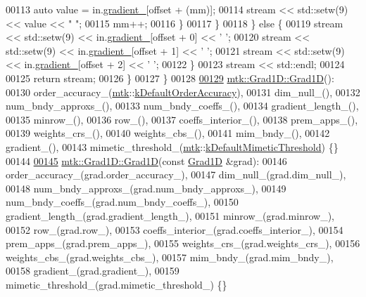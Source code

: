 \begin{DoxyCode}
00113         \textcolor{keyword}{auto} value = in.\hyperlink{classmtk_1_1Grad1D_a024b84b1ea285c0c590eb42d40ff4469}{gradient\_}[offset + (mm)];
00114         stream << std::setw(9) << value << \textcolor{stringliteral}{" "};
00115         mm++;
00116       \}
00117     \}
00118   \} \textcolor{keywordflow}{else} \{
00119     stream << std::setw(9) << in.\hyperlink{classmtk_1_1Grad1D_a024b84b1ea285c0c590eb42d40ff4469}{gradient\_}[offset + 0] << \textcolor{charliteral}{' '};
00120     stream << std::setw(9) << in.\hyperlink{classmtk_1_1Grad1D_a024b84b1ea285c0c590eb42d40ff4469}{gradient\_}[offset + 1] << \textcolor{charliteral}{' '};
00121     stream << std::setw(9) << in.\hyperlink{classmtk_1_1Grad1D_a024b84b1ea285c0c590eb42d40ff4469}{gradient\_}[offset + 2] << \textcolor{charliteral}{' '};
00122   \}
00123   stream << std::endl;
00124 
00125   \textcolor{keywordflow}{return} stream;
00126 \}
00127 \}
00128 
\hypertarget{mtk__grad__1d_8cc_source_l00129}{}\hyperlink{classmtk_1_1Grad1D_ae21e6ac2652e653c48f15b304ee83a75}{00129} \hyperlink{classmtk_1_1Grad1D_ae21e6ac2652e653c48f15b304ee83a75}{mtk::Grad1D::Grad1D}():
00130   order\_accuracy\_(\hyperlink{namespacemtk}{mtk}::\hyperlink{group__c01-roots_ga0d95560098eb36420511103637b6952f}{kDefaultOrderAccuracy}),
00131   dim\_null\_(),
00132   num\_bndy\_approxs\_(),
00133   num\_bndy\_coeffs\_(),
00134   gradient\_length\_(),
00135   minrow\_(),
00136   row\_(),
00137   coeffs\_interior\_(),
00138   prem\_apps\_(),
00139   weights\_crs\_(),
00140   weights\_cbs\_(),
00141   mim\_bndy\_(),
00142   gradient\_(),
00143   mimetic\_threshold\_(\hyperlink{namespacemtk}{mtk}::\hyperlink{group__c01-roots_ga35718d949bdc81a08a9cc8ebbe3478a2}{kDefaultMimeticThreshold}) \{\}
00144 
\hypertarget{mtk__grad__1d_8cc_source_l00145}{}\hyperlink{classmtk_1_1Grad1D_a5708bcb61bde3f7f3a4ddede191d82a4}{00145} \hyperlink{classmtk_1_1Grad1D_ae21e6ac2652e653c48f15b304ee83a75}{mtk::Grad1D::Grad1D}(\textcolor{keyword}{const} \hyperlink{classmtk_1_1Grad1D}{Grad1D} &grad):
00146   order\_accuracy\_(grad.order\_accuracy\_),
00147   dim\_null\_(grad.dim\_null\_),
00148   num\_bndy\_approxs\_(grad.num\_bndy\_approxs\_),
00149   num\_bndy\_coeffs\_(grad.num\_bndy\_coeffs\_),
00150   gradient\_length\_(grad.gradient\_length\_),
00151   minrow\_(grad.minrow\_),
00152   row\_(grad.row\_),
00153   coeffs\_interior\_(grad.coeffs\_interior\_),
00154   prem\_apps\_(grad.prem\_apps\_),
00155   weights\_crs\_(grad.weights\_crs\_),
00156   weights\_cbs\_(grad.weights\_cbs\_),
00157   mim\_bndy\_(grad.mim\_bndy\_),
00158   gradient\_(grad.gradient\_),
00159   mimetic\_threshold\_(grad.mimetic\_threshold\_) \{\}

\end{DoxyCode}
